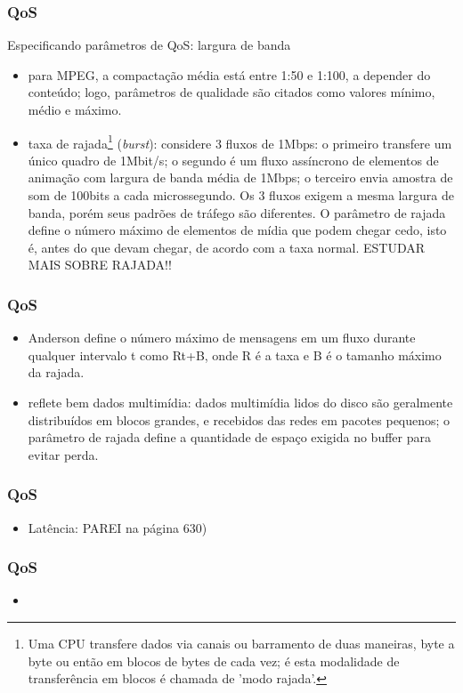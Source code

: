 \documentclass[]{beamer}
\begin{document}
\begin{frame}
  \frametitle{QoS}
Especificando parâmetros de QoS: largura de banda
\begin{itemize}
  \item  para MPEG, a compactação média está entre 1:50 e 1:100, a depender
do conteúdo; logo, parâmetros de qualidade são citados como valores mínimo, médio e máximo.
  \item taxa de rajada\footnote{Uma CPU transfere dados via canais ou barramento 
de duas maneiras, byte a byte ou então em blocos de bytes de cada vez; 
é esta modalidade de transferência em blocos é chamada de 'modo rajada'.\cite{site1:2011}} 
(\emph{burst}): considere 3 fluxos de 1Mbps: o primeiro transfere um único quadro de 1Mbit/s;
o segundo é um fluxo assíncrono de elementos de animação
com largura de banda média de 1Mbps; o terceiro envia amostra de 
som de 100bits a cada microssegundo. Os 3 fluxos exigem a mesma largura de banda, porém
seus padrões de tráfego são diferentes. O parâmetro de rajada define o número máximo de 
elementos de mídia que podem chegar cedo, isto é, antes do que devam chegar, de acordo
com a taxa normal. ESTUDAR MAIS SOBRE RAJADA!!
\end{itemize}
\end{frame}

\begin{frame}
  \frametitle{QoS}
\begin{itemize}
  \item Anderson
define o número máximo de mensagens em um fluxo durante qualquer intervalo t como Rt+B,
onde R é a taxa e B é o tamanho máximo da rajada.
  \item reflete bem dados multimídia: dados multimídia lidos do disco são geralmente 
distribuídos em blocos grandes,
e recebidos das redes em pacotes pequenos; o parâmetro de rajada define a quantidade de
espaço exigida no buffer para evitar perda.
\end{itemize}
\end{frame}

\begin{frame}
  \frametitle{QoS}
\begin{itemize}
  \item Latência: PAREI na página 630)
\end{itemize}
\end{frame}

\begin{frame}
  \frametitle{QoS}
\begin{itemize}
  \item 
\end{itemize}
\end{frame}
\end{document}
